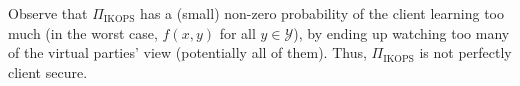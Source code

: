\documentclass{llncs}
\newcommand{\OT}{\operatorname{OT}}
\newcommand{\bOT}[2]{#1\text{-out-of-}#2\text{ bit-}\OT}
\newcommand{\Y}{\mathcal{Y}}
\newcommand{\IKOPS}{\operatorname{IKOPS}}
\begin{document}






Observe that $\Pi_{\IKOPS}$ has a (small) non-zero probability of the client learning too much (in the worst case, $f(x,y)$ for all $y\in\Y$), by ending up watching too many of the virtual parties' view (potentially all of them). Thus, $\Pi_{\IKOPS}$ is not perfectly client secure.
\end{document}
